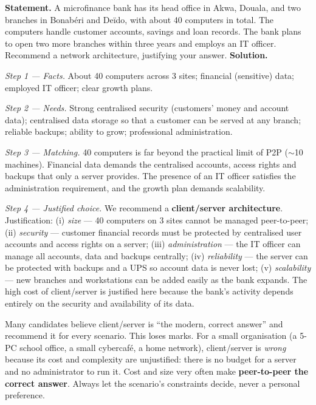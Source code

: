 \documentclass[11pt]{article}
\begin{document}
\begin{exoresolu}
\textbf{Statement.} A microfinance bank has its head office in Akwa, Douala, and two branches in Bonabéri and Deïdo, with about 40 computers in total. The computers handle customer accounts, savings and loan records. The bank plans to open two more branches within three years and employs an IT officer. Recommend a network architecture, justifying your answer.
\tcblower
\textbf{Solution.}

\emph{Step 1 — Facts.} About 40 computers across 3 sites; financial (sensitive) data; employed IT officer; clear growth plans.

\emph{Step 2 — Needs.} Strong centralised security (customers' money and account data); centralised data storage so that a customer can be served at any branch; reliable backups; ability to grow; professional administration.

\emph{Step 3 — Matching.} 40 computers is far beyond the practical limit of P2P ($\sim$10 machines). Financial data demands the centralised accounts, access rights and backups that only a server provides. The presence of an IT officer satisfies the administration requirement, and the growth plan demands scalability.

\emph{Step 4 — Justified choice.} We recommend a \textbf{client/server architecture}. Justification: (i) \emph{size} — 40 computers on 3 sites cannot be managed peer-to-peer; (ii) \emph{security} — customer financial records must be protected by centralised user accounts and access rights on a server; (iii) \emph{administration} — the IT officer can manage all accounts, data and backups centrally; (iv) \emph{reliability} — the server can be protected with backups and a UPS so account data is never lost; (v) \emph{scalability} — new branches and workstations can be added easily as the bank expands. The high cost of client/server is justified here because the bank's activity depends entirely on the security and availability of its data.
\end{exoresolu}

\begin{attention}
Many candidates believe client/server is ``the modern, correct answer'' and recommend it for every scenario. This loses marks. For a small organisation (a 5-PC school office, a small cybercafé, a home network), client/server is \emph{wrong} because its cost and complexity are unjustified: there is no budget for a server and no administrator to run it. Cost and size very often make \textbf{peer-to-peer the correct answer}. Always let the scenario's constraints decide, never a personal preference.
\end{attention}
\end{document}
